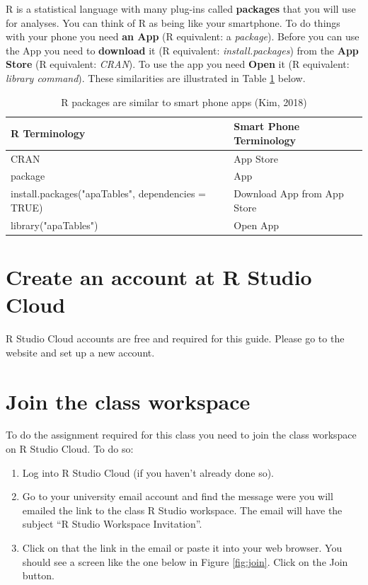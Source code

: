 \documentclass[
]{krantz}
\begin{document}
R is a statistical language with many plug-ins called \textbf{packages} that you will use for analyses. You can think of R as being like your smartphone. To do things with your phone you need \textbf{an App} (R equivalent: a \emph{package}). Before you can use the App you need to \textbf{download} it (R equivalent: \emph{install.packages}) from the \textbf{App Store} (R equivalent: \emph{CRAN}). To use the app you need \textbf{Open} it (R equivalent: \emph{library command}). These similarities are illustrated in Table \ref{tab:appstore} below.

\begin{table}

\caption{\label{tab:appstore}R packages are similar to smart phone apps (Kim, 2018)}
\centering
\begin{tabular}[t]{ll}
\toprule
R Terminology & Smart Phone Terminology\\
\midrule
CRAN & App Store\\
package & App\\
install.packages("apaTables", dependencies = TRUE) & Download App from App Store\\
library("apaTables") & Open App\\
\bottomrule
\end{tabular}
\end{table}

\hypertarget{create-an-account-at-r-studio-cloud}{%
\section{Create an account at R Studio Cloud}\label{create-an-account-at-r-studio-cloud}}

R Studio Cloud accounts are free and required for this guide. Please go to the website and set up a new account.

\hypertarget{join-the-class-workspace}{%
\section{Join the class workspace}\label{join-the-class-workspace}}

To do the assignment required for this class you need to join the class workspace on R Studio Cloud. To do so:

\begin{enumerate}
\def\labelenumi{\arabic{enumi}.}
\item
  Log into R Studio Cloud (if you haven't already done so).
\item
  Go to your university email account and find the message were you will emailed the link to the class R Studio workspace. The email will have the subject ``R Studio Workspace Invitation''.
\item
  Click on that the link in the email or paste it into your web browser. You should see a screen like the one below in Figure \ref{fig:join}. Click on the Join button.
\end{enumerate}
\end{document}
